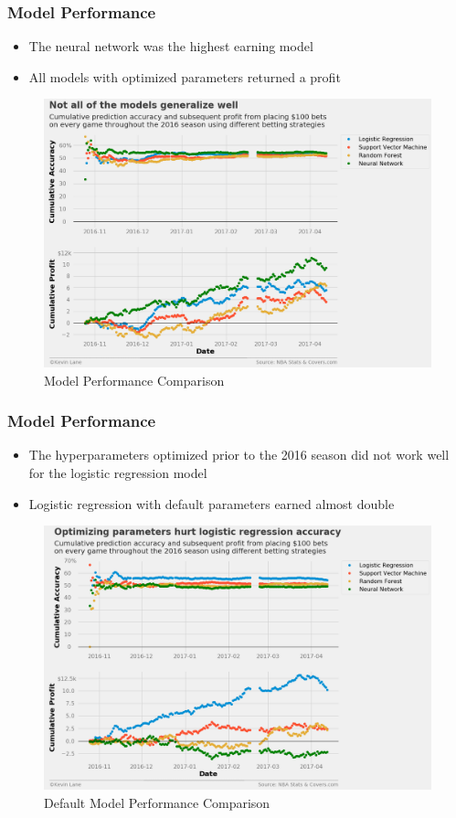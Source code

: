 \documentclass{beamer}
\begin{document}
\begin{frame}
\frametitle{Model Performance}
\begin{itemize}
    \item The neural network was the highest earning model
    \item All models with optimized parameters returned a profit
\end{itemize}
\begin{figure}
\includegraphics[scale=0.2]{../docs/assets/images/model-performance/model-performance-comparison.png}
\caption{Model Performance Comparison}
\end{figure}
\end{frame}

\begin{frame}
\frametitle{Model Performance}
\begin{itemize}
    \item The hyperparameters optimized prior to the 2016 season did not work well for the logistic regression model
    \item Logistic regression with default parameters earned almost double
\end{itemize}
\begin{figure}
\includegraphics[scale=0.2]{../docs/assets/images/model-performance/default-model-performance-comparison.png}
\caption{Default Model Performance Comparison}
\end{figure}
\end{frame}
\end{document}
